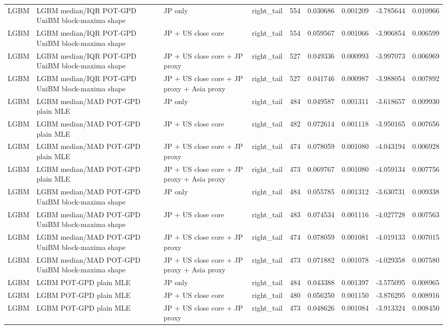 \begin{tabular}{lll lrrrrr}
LGBM & LGBM median/IQR POT-GPD UniBM block-maxima shape & JP only & right\_tail & 554 & 0.030686 & 0.001209 & -3.785644 & 0.010966 \\
LGBM & LGBM median/IQR POT-GPD UniBM block-maxima shape & JP + US close core & right\_tail & 554 & 0.059567 & 0.001066 & -3.906854 & 0.006599 \\
LGBM & LGBM median/IQR POT-GPD UniBM block-maxima shape & JP + US close core + JP proxy & right\_tail & 527 & 0.049336 & 0.000993 & -3.997073 & 0.006969 \\
LGBM & LGBM median/IQR POT-GPD UniBM block-maxima shape & JP + US close core + JP proxy + Asia proxy & right\_tail & 527 & 0.041746 & 0.000987 & -3.988054 & 0.007892 \\
LGBM & LGBM median/MAD POT-GPD plain MLE & JP only & right\_tail & 484 & 0.049587 & 0.001311 & -3.618657 & 0.009930 \\
LGBM & LGBM median/MAD POT-GPD plain MLE & JP + US close core & right\_tail & 482 & 0.072614 & 0.001118 & -3.950165 & 0.007656 \\
LGBM & LGBM median/MAD POT-GPD plain MLE & JP + US close core + JP proxy & right\_tail & 474 & 0.078059 & 0.001080 & -4.043194 & 0.006928 \\
LGBM & LGBM median/MAD POT-GPD plain MLE & JP + US close core + JP proxy + Asia proxy & right\_tail & 473 & 0.069767 & 0.001080 & -4.059134 & 0.007756 \\
LGBM & LGBM median/MAD POT-GPD UniBM block-maxima shape & JP only & right\_tail & 484 & 0.055785 & 0.001312 & -3.630731 & 0.009338 \\
LGBM & LGBM median/MAD POT-GPD UniBM block-maxima shape & JP + US close core & right\_tail & 483 & 0.074534 & 0.001116 & -4.027728 & 0.007563 \\
LGBM & LGBM median/MAD POT-GPD UniBM block-maxima shape & JP + US close core + JP proxy & right\_tail & 474 & 0.078059 & 0.001081 & -4.019133 & 0.007015 \\
LGBM & LGBM median/MAD POT-GPD UniBM block-maxima shape & JP + US close core + JP proxy + Asia proxy & right\_tail & 473 & 0.071882 & 0.001078 & -4.029358 & 0.007580 \\
LGBM & LGBM POT-GPD plain MLE & JP only & right\_tail & 484 & 0.043388 & 0.001397 & -3.575095 & 0.008965 \\
LGBM & LGBM POT-GPD plain MLE & JP + US close core & right\_tail & 480 & 0.056250 & 0.001150 & -3.876295 & 0.008916 \\
LGBM & LGBM POT-GPD plain MLE & JP + US close core + JP proxy & right\_tail & 473 & 0.048626 & 0.001084 & -3.913324 & 0.008450 \\

\end{tabular}

